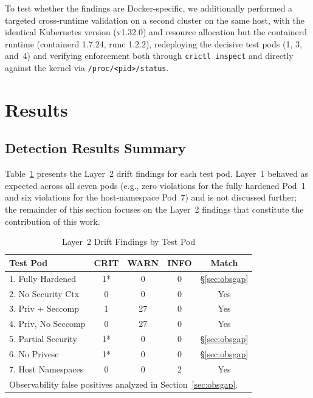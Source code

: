 \documentclass[sigconf]{acmart}
\begin{document}
To test whether the findings are Docker-specific, we additionally performed a targeted cross-runtime validation on a second cluster on the same host, with the identical Kubernetes version (v1.32.0) and resource allocation but the containerd runtime (containerd 1.7.24, runc 1.2.2), redeploying the decisive test pods (1, 3, and~4) and verifying enforcement both through \texttt{crictl inspect} and directly against the kernel via \texttt{/proc/<pid>/status}.

\section{Results}

\subsection{Detection Results Summary}

Table~\ref{tab:results} presents the Layer~2 drift findings for each test pod. Layer~1 behaved as expected across all seven pods (e.g., zero violations for the fully hardened Pod~1 and six violations for the host-namespace Pod~7) and is not discussed further; the remainder of this section focuses on the Layer~2 findings that constitute the contribution of this work.

\begin{table}[htbp]
\caption{Layer~2 Drift Findings by Test Pod}
\label{tab:results}
\centering
\begin{tabular}{lcccc}
\toprule
\textbf{Test Pod} & \textbf{CRIT} & \textbf{WARN} & \textbf{INFO} & \textbf{Match} \\
\midrule
1. Fully Hardened   & 1*  & 0  & 0 & \S\ref{sec:obsgap} \\
2. No Security Ctx  & 0   & 0  & 0 & Yes \\
3. Priv + Seccomp   & 1   & 27 & 0 & Yes \\
4. Priv, No Seccomp & 0   & 27 & 0 & Yes \\
5. Partial Security & 1*  & 0  & 0 & \S\ref{sec:obsgap} \\
6. No Privesc       & 1*  & 0  & 0 & \S\ref{sec:obsgap} \\
7. Host Namespaces  & 0   & 0  & 2 & Yes \\
\bottomrule
\multicolumn{5}{l}{\footnotesize *Observability false positives analyzed in Section~\ref{sec:obsgap}.}
\end{tabular}
\end{table}
\end{document}
